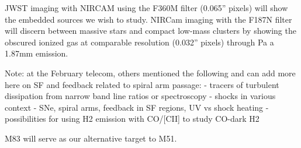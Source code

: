 \documentclass[12pt]{article}
\begin{document}
JWST imaging with NIRCAM using the F360M filter (0.065” pixels) will show the embedded sources we wish to study. NIRCam imaging with the F187N filter will discern between massive stars and compact low-mass clusters by showing the obscured ionized gas at comparable resolution (0.032” pixels) through Pa a 1.87mm emission.
 
Note: at the February telecom, others mentioned the following and can add more here on SF and feedback related to spiral arm passage:
        - tracers of turbulent dissipation from narrow band line ratios or spectroscopy
        - shocks in various context - SNe, spiral arms, feedback in SF regions, UV vs shock heating
        - possibilities for using H2 emission with CO/[CII] to study CO-dark H2


%

\describeobservations   %




%

\alttargets   %
M83 will serve as our alternative target to M51.  
\end{document}
